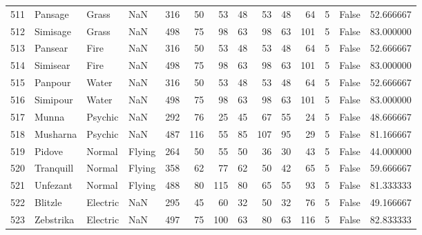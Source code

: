 \begin{tabular}{rlllrrrrrrrrlr}
 511 &                    Pansage &     Grass &       NaN &    316 &   50 &      53 &       48 &       53 &       48 &     64 &           5 &      False &   52.666667 \\
 512 &                   Simisage &     Grass &       NaN &    498 &   75 &      98 &       63 &       98 &       63 &    101 &           5 &      False &   83.000000 \\
 513 &                    Pansear &      Fire &       NaN &    316 &   50 &      53 &       48 &       53 &       48 &     64 &           5 &      False &   52.666667 \\
 514 &                   Simisear &      Fire &       NaN &    498 &   75 &      98 &       63 &       98 &       63 &    101 &           5 &      False &   83.000000 \\
 515 &                    Panpour &     Water &       NaN &    316 &   50 &      53 &       48 &       53 &       48 &     64 &           5 &      False &   52.666667 \\
 516 &                   Simipour &     Water &       NaN &    498 &   75 &      98 &       63 &       98 &       63 &    101 &           5 &      False &   83.000000 \\
 517 &                      Munna &   Psychic &       NaN &    292 &   76 &      25 &       45 &       67 &       55 &     24 &           5 &      False &   48.666667 \\
 518 &                   Musharna &   Psychic &       NaN &    487 &  116 &      55 &       85 &      107 &       95 &     29 &           5 &      False &   81.166667 \\
 519 &                     Pidove &    Normal &    Flying &    264 &   50 &      55 &       50 &       36 &       30 &     43 &           5 &      False &   44.000000 \\
 520 &                  Tranquill &    Normal &    Flying &    358 &   62 &      77 &       62 &       50 &       42 &     65 &           5 &      False &   59.666667 \\
 521 &                   Unfezant &    Normal &    Flying &    488 &   80 &     115 &       80 &       65 &       55 &     93 &           5 &      False &   81.333333 \\
 522 &                    Blitzle &  Electric &       NaN &    295 &   45 &      60 &       32 &       50 &       32 &     76 &           5 &      False &   49.166667 \\
 523 &                  Zebstrika &  Electric &       NaN &    497 &   75 &     100 &       63 &       80 &       63 &    116 &           5 &      False &   82.833333 \\

\end{tabular}
